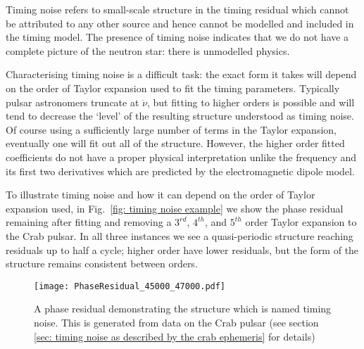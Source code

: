 Timing noise refers to small-scale structure in the timing residual which
cannot be attributed to any other source and hence cannot be modelled and
included in the timing model. The presence of timing noise indicates that we do
not have a complete picture of the neutron star: there is unmodelled physics.

Characterising timing noise is a difficult task: the exact form it takes will
depend on the order of Taylor expansion used to fit the timing parameters.
Typically pulsar astronomers truncate at $\ddot{\nu}$, but fitting to higher
orders is possible and will tend to decrease the `level' of the resulting
structure understood as timing noise. Of course using a sufficiently large
number of terms in the Taylor expansion, eventually one will fit out all of the
structure.  However, the higher order fitted coefficients do not have a proper
physical interpretation unlike the frequency and its first two derivatives
which are predicted by the electromagnetic dipole model.

To illustrate timing noise and how it can depend on the order of Taylor
expansion used, in Fig.~\ref{fig: timing noise example} we show the phase
residual remaining after fitting and removing a $3^{rd}$, $4^{th}$, and
$5^{th}$ order Taylor expansion to the Crab pulsar. In all three instances we
see a quasi-periodic structure reaching residuals up to half a cycle; higher
order have lower residuals, but the form of the structure remains consistent
between orders.  \begin{figure}[htb] \centering
\texttt{[image: PhaseResidual\_45000\_47000.pdf]}
\caption{A phase residual demonstrating the structure which is named timing
noise. This is generated from data on the Crab pulsar (see section \ref{sec:
timing noise as described by the crab ephemeris} for details)} \label{fig:
timing noise example} \end{figure}

